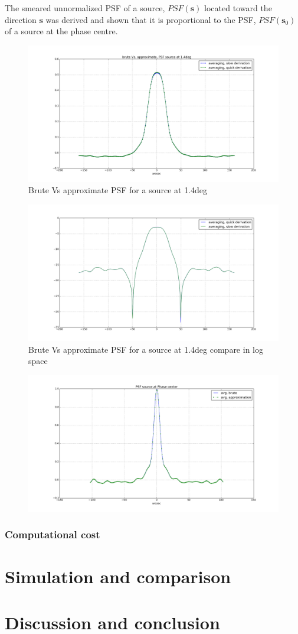 The smeared unnormalized PSF of a source, $PSF(\mathbf{s})$ located toward the
direction $\mathbf{s}$ was derived and shown that it is proportional
to the PSF, $PSF(\mathbf{s}_0)$ of a source at the phase centre.
\begin{figure}
\includegraphics[width=1\textwidth]{./Figures/averaging_brute_quick_good.png}\caption{Brute Vs approximate PSF for a source at 1.4deg}\label{fig:uvcov}
 \end{figure}
 \begin{figure}
\includegraphics[width=1\textwidth]{./Figures/averaging_brute_quick_logscale.png}\caption{Brute Vs approximate PSF for a source at 1.4deg compare in log space}\label{fig:corrSigVLAMxBl_overlapGdelta}
\end{figure}
 \begin{figure}
\includegraphics[width=1\textwidth]{./Figures/phasecentre.png}
\end{figure}
 \subsubsection{Computational cost} 
 \section{Simulation and comparison}
 \section{Discussion and conclusion}

